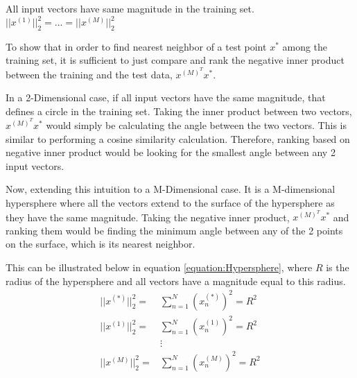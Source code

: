 \documentclass[a4paper,12pt]{article}
\begin{document}
All input vectors have same magnitude in the training set. 
$||x^{(1)}||_{2}^{2} = ... = ||x^{(M)}||_{2}^{2}$

To show that in order to find nearest neighbor of a test point $x^{*}$ among the training set, it is sufficient to just compare and rank the negative inner product between the training and the test data, $x^{(M)^{T}}x^{*}$. 

In a 2-Dimensional case, if all input vectors have the same magnitude, that defines a circle in the training set. Taking the inner product between two vectors, $x^{(M)^{T}}x^{*}$ would simply be calculating the angle between the two vectors. This is similar to performing a cosine similarity calculation. Therefore, ranking based on negative inner product would be looking for the smallest angle between any 2 input vectors. 

Now, extending this intuition to a M-Dimensional case. It is a M-dimensional hypersphere where all the vectors extend to the surface of the hypersphere as they have the same magnitude. Taking the negative inner product, $x^{(M)^{T}}x^{*}$ and ranking them would be finding the minimum angle between any of the 2 points on the surface, which is its nearest neighbor. 

This can be illustrated below in equation \ref{equation:Hypersphere}, where
$R$ is the radius of the hypersphere and all vectors have a magnitude equal to this radius. 
\begin{equation}
\label{equation:Hypersphere}
\begin{split}
||x^{(*)}||_{2}^{2} =& \sum_{n=1}^{N} (x^{(*)}_{n})^{2} = R^{2} \\
||x^{(1)}||_{2}^{2} =& \sum_{n=1}^{N} (x^{(1)}_{n})^{2} = R^{2} \\
&\vdots \\
||x^{(M)}||_{2}^{2} =& \sum_{n=1}^{N} (x^{(M)}_{n})^{2} = R^{2}
\end{split}
\end{equation}
\end{document}
